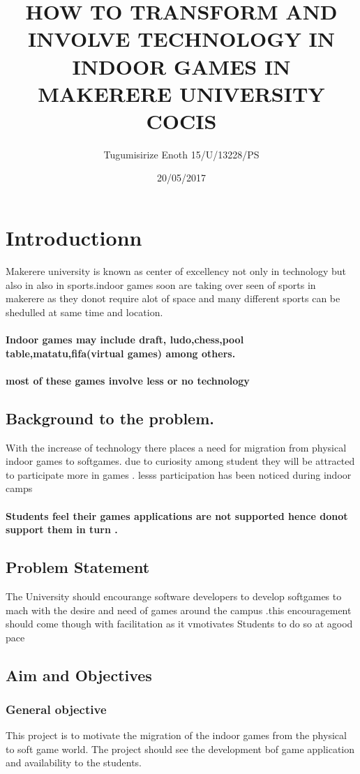 \documentclass{Report}
\title{HOW TO TRANSFORM  AND INVOLVE TECHNOLOGY IN INDOOR GAMES IN MAKERERE UNIVERSITY COCIS}
\author{ Tugumisirize Enoth 15/U/13228/PS}
\date{20/05/2017}
\begin{document}
  \maketitle
 
  
  \section{Introductionn}
Makerere university is known as center of excellency not only in technology  but also in also in sports.indoor games soon are taking over seen of sports in makerere as they donot require alot of space and many different sports can be shedulled at same time and location.\paragraph{Indoor games may include draft, ludo,chess,pool table,matatu,fifa(virtual games) among others.}
\paragraph{ most of these games involve less or no technology}
      	\subsection{ Background to the problem.}
With the increase of technology there places a need for migration from physical indoor games to softgames. due to curiosity among student they will be attracted to participate more in games . lesss participation has been noticed during indoor camps
\paragraph{ Students feel their games applications are not supported hence donot support them in turn .}
	\subsection{ Problem Statement}
The University should encourange software developers to develop softgames to mach with the desire and need of games around the campus .this encouragement should come though with facilitation as it vmotivates Students to  do so at agood pace

	\subsection{Aim and Objectives}

	\subsubsection{  General objective}
This project is to motivate the migration of the indoor games from the physical to soft game world.
The project should see the development bof  game application and availability to the students.
\end{document}

